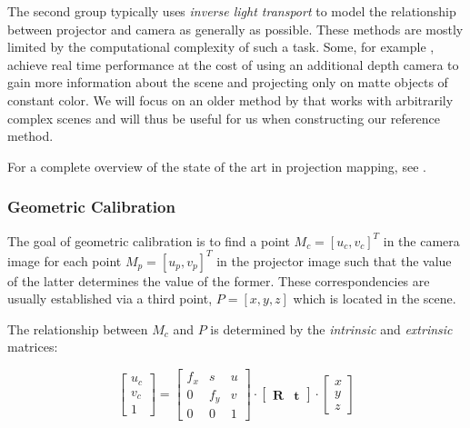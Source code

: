 The second group typically uses \textit{inverse light transport} to model the relationship between projector and camera as generally as possible. These methods are mostly limited by the computational complexity of such a task. Some, for example \citet{Siegl2017}, achieve real time performance at the cost of using an additional depth camera to gain more information about the scene and projecting only on matte objects of constant color. We will focus on an older method by \citet{Wetzstein2007} that works with arbitrarily complex scenes and will thus be useful for us when constructing our reference method.

For a complete overview of the state of the art in projection mapping, see \citet{Grundhofer2018}.

\subsubsection{Geometric Calibration}
\label{section:background-projection_mapping-procams-geometric_calibration}

The goal of geometric calibration is to find a point \(M_c = [u_c, v_c]^T\) in the camera image for each point \(M_p = [u_p, v_p]^T\) in the projector image such that the value of the latter determines the value of the former. These correspondencies are usually established via a third point, \(P = [x, y, z]\) which is located in the scene.

The relationship between \(M_c\) and \(P\) is determined by the \textit{intrinsic} and \textit{extrinsic} matrices:

\begin{equation}
    \label{eq:camera_equation}
    \begin{bmatrix}
        u_c \\
        v_c \\
        1
    \end{bmatrix} =
    \begin{bmatrix}
        f_x & s & u \\
        0 & f_y & v \\
        0 & 0 & 1 
    \end{bmatrix} \cdot
    \begin{bmatrix}
        \mathbf{R} & \mathbf{t}
    \end{bmatrix} \cdot
    \begin{bmatrix}
        x \\
        y \\
        z
    \end{bmatrix}
\end{equation}

